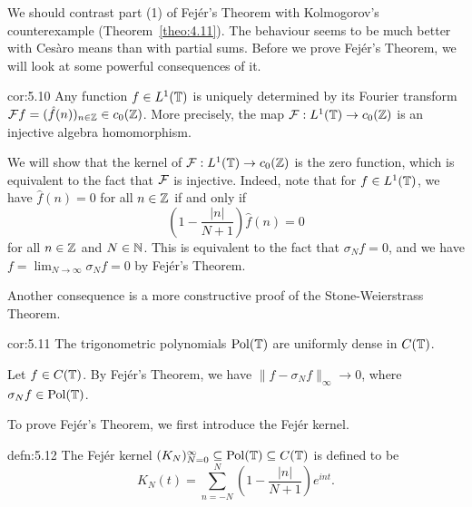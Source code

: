 We should contrast part (1) of Fej\'er's Theorem with Kolmogorov's counterexample 
(Theorem~\ref{theo:4.11}). The behaviour seems to be much better with Ces\`aro means 
than with partial sums. Before we prove Fej\'er's Theorem, we will look at some 
powerful consequences of it. 

\begin{cor}{cor:5.10}
    Any function $f \in L^1(\mathbb{T})$ is uniquely determined by its Fourier transform 
    ${\cal F}f = (\hat f(n))_{n\in\mathbb{Z}} \in c_0(\mathbb{Z})$. More precisely, the 
    map ${\cal F} : L^1(\mathbb{T}) \to c_0(\mathbb{Z})$ is an injective algebra homomorphism. 
\end{cor}
\begin{pf}
    We will show that the kernel of ${\cal F} : L^1(\mathbb{T}) \to c_0(\mathbb{Z})$ is the zero 
    function, which is equivalent to the fact that ${\cal F}$ is injective. 
    Indeed, note that for $f \in L^1(\mathbb{T})$, we have $\hat f(n) = 0$ for all $n \in \mathbb{Z}$ 
    if and only if 
    \[ \left( 1 - \frac{|n|}{N+1} \right) \hat f(n) = 0 \] 
    for all $n \in \mathbb{Z}$ and $N \in \mathbb{N}$. This is equivalent to the fact that 
    $\sigma_N f = 0$, and we have $f = \lim_{N\to\infty} \sigma_N f = 0$ by 
    Fej\'er's Theorem. 
\end{pf}

Another consequence is a more constructive proof of the Stone-Weierstrass Theorem. 

\begin{cor}{cor:5.11}
    The trigonometric polynomials $\operatorname{Pol}(\mathbb{T})$ are uniformly dense in $C(\mathbb{T})$. 
\end{cor}
\begin{pf}
    Let $f \in C(\mathbb{T})$. By Fej\'er's Theorem, we have $\|f - \sigma_N f\|_\infty \to 0$, 
    where $\sigma_N f \in \operatorname{Pol}(\mathbb{T})$. 
\end{pf}

To prove Fej\'er's Theorem, we first introduce the Fej\'er kernel. 

\begin{defn}{defn:5.12}
    The Fej\'er kernel $(K_N)_{N=0}^\infty \subseteq \operatorname{Pol}(\mathbb{T}) \subseteq C(\mathbb{T})$ is 
    defined to be 
    \[ K_N(t) = \sum_{n=-N}^N \left( 1 - \frac{|n|}{N+1} \right) e^{int}. \] 
\end{defn}

